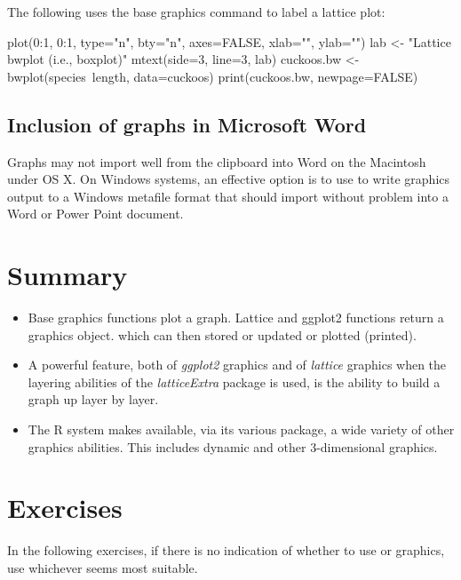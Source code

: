 The following uses the base graphics command 
to label a lattice plot:
\begin{Schunk}
\begin{Sinput}
plot(0:1, 0:1, type="n", bty="n", axes=FALSE,
     xlab="", ylab="")
lab <- "Lattice bwplot (i.e., boxplot)"
mtext(side=3, line=3, lab)
cuckoos.bw <- bwplot(species~length, data=cuckoos)
print(cuckoos.bw, newpage=FALSE)
\end{Sinput}
\end{Schunk}

\subsection*{Inclusion of graphs in Microsoft Word}

Graphs may not import well from the clipboard into Word on the
Macintosh under OS X.  On Windows systems, an effective option is to
use  to write graphics output to a Windows
metafile format that should import without problem into a Word or
Power Point document.

\section{Summary}
\begin{itemize}
\item[] Base graphics functions plot a graph.  Lattice and ggplot2
functions return a graphics object. which can then stored or updated
or plotted (printed).

\item[] A powerful feature, both of \textit{ggplot2} graphics and of
  \textit{lattice} graphics when the layering abilities of the
  \textit{latticeExtra} package is used, is the ability to build a
  graph up layer by layer.

\item[] The R system makes available, via its various package,
a wide variety of other graphics abilities.  This includes
dynamic and other 3-dimensional graphics.
\end{itemize}


\section{Exercises}\label{sec:plot}
In the following exercises, if there is no indication of whether to
use  or  graphics, use whichever seems
most suitable.

